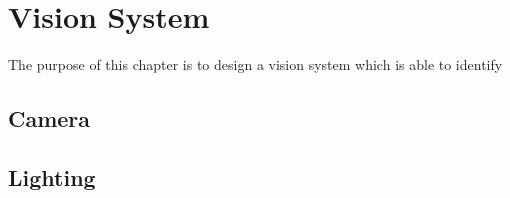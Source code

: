 \chapter{Vision System}
The purpose of this chapter is to design a vision system which is able to identify  
\section{Camera}

\section{Lighting}




